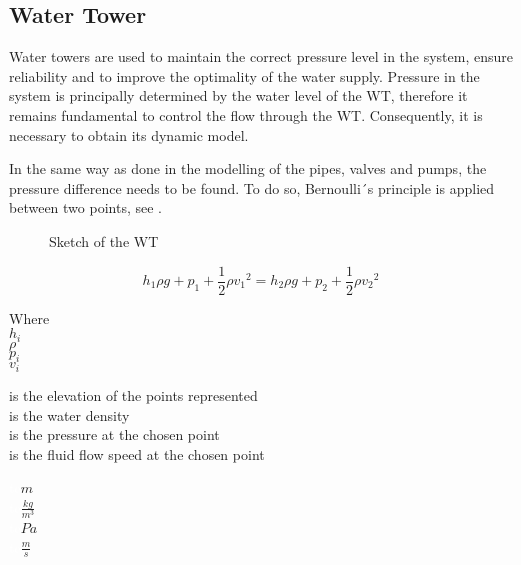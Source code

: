 \subsection{Water Tower} 
\label{WaterTankModel}

Water towers are used to maintain the correct pressure level in the system, ensure reliability and to improve the optimality of the water supply. 
Pressure in the system is principally determined by the water level of the WT, therefore it remains fundamental to control the flow through the WT. Consequently, it is 
necessary to obtain its dynamic model. 

In the same way as done in the modelling of the pipes, valves and pumps, the pressure difference needs to be found. 
To do so, Bernoulli´s principle is applied between two points, see .


\begin{figure}[H]
\centering
 
\caption{Sketch of the WT}
\label{fig:watertower_sketch}
\end{figure}


\begin{equation}
  \label{bernoulli}
  h_1\rho g + p_1 + \frac{1}{2}\rho {v_1}^2 = h_2\rho g + p_2 + \frac{1}{2}\rho {v_2}^2
\end{equation}

\begin{minipage}[t]{0.20\textwidth}
Where\\
\hspace*{8mm} $h_i$ \\
\hspace*{8mm} $\rho$ \\
\hspace*{8mm} $p_i$ \\
\hspace*{8mm} $v_i$ \\

\end{minipage}
\begin{minipage}[t]{0.68\textwidth}
\vspace*{2mm}
is the elevation of the points represented\\
is the water density\\
is the pressure at the chosen point\\
is the fluid flow speed at the chosen point
\end{minipage}
\begin{minipage}[t]{0.10\textwidth}
\vspace*{2mm}
\textcolor{White}{te}$\unit{m}$\\
\textcolor{White}{te}$\unit{\frac{kg}{m^3}}$\\
\textcolor{White}{te}$\unit{Pa}$\\
\textcolor{White}{te}$\unit{\frac{m}{s}}$
\end{minipage}

